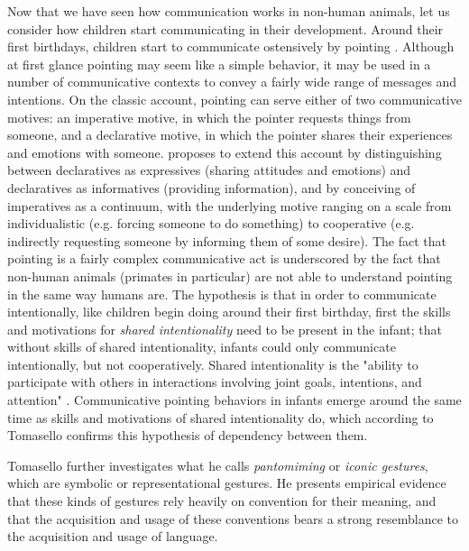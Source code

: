 Now that we have seen how communication works in non-human animals, let us consider how children start communicating in their development.
Around their first birthdays, children start to communicate ostensively by pointing \citep{Tomasello08-origins}. Although at first glance pointing may seem like a simple behavior, it may be used in a number of communicative contexts to convey a fairly wide range of messages and intentions. 
On the classic account, pointing can serve either of two communicative motives: an imperative motive, in which the pointer requests things from someone, and a declarative motive, in which the pointer shares their experiences and emotions with someone. 
\citet{Tomasello08-origins} proposes to extend this account by distinguishing between declaratives as expressives (sharing attitudes and emotions) and declaratives as informatives (providing information), and by conceiving of imperatives as a continuum, with the underlying motive ranging on a scale from individualistic (e.g. forcing someone to do something) to cooperative (e.g. indirectly requesting someone by informing them of some desire). 
The fact that pointing is a fairly complex communicative act is underscored by the fact that non-human animals (primates in particular) are not able to understand pointing in the same way humans are. 
The hypothesis is that in order to communicate intentionally, like children begin doing around their first birthday, first the skills and motivations for \emph{shared intentionality} need to be present in the infant; that without skills of shared intentionality, infants could only communicate intentionally, but not cooperatively.
Shared intentionality is the "ability to participate with others in interactions involving joint goals, intentions, and attention" \citep[p.~139]{Tomasello08-origins}. Communicative pointing behaviors in infants emerge around the same time as skills and motivations of shared intentionality do, which according to Tomasello confirms this hypothesis of dependency between them.

Tomasello further investigates what he calls \emph{pantomiming} or \emph{iconic gestures}, which are symbolic or representational gestures. 
He presents empirical evidence that these kinds of gestures rely heavily on convention for their meaning, and that the acquisition and usage of these conventions bears a strong resemblance to the acquisition and usage of language.

